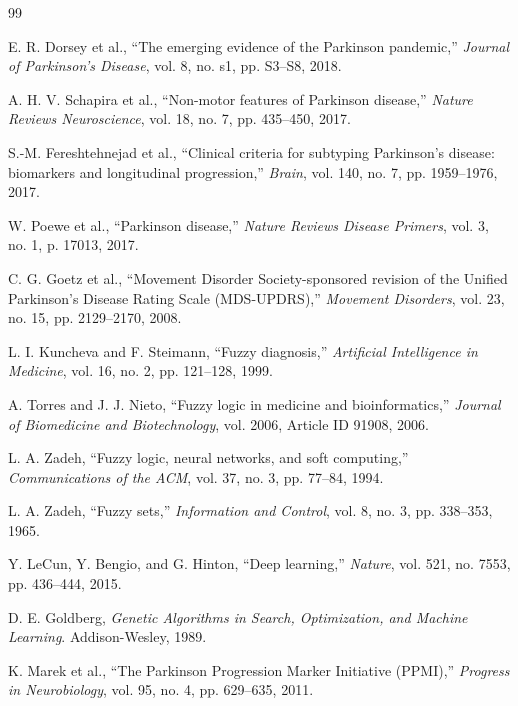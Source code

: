 \documentclass[pdflatex,sn-mathphys-num]{sn-jnl}
\begin{document}
\begin{thebibliography}{99}

E. R. Dorsey et al., ``The emerging evidence of the Parkinson pandemic,'' \textit{Journal of Parkinson's Disease}, vol. 8, no. s1, pp. S3--S8, 2018.

A. H. V. Schapira et al., ``Non-motor features of Parkinson disease,'' \textit{Nature Reviews Neuroscience}, vol. 18, no. 7, pp. 435--450, 2017.

S.-M. Fereshtehnejad et al., ``Clinical criteria for subtyping Parkinson's disease: biomarkers and longitudinal progression,'' \textit{Brain}, vol. 140, no. 7, pp. 1959--1976, 2017.

W. Poewe et al., ``Parkinson disease,'' \textit{Nature Reviews Disease Primers}, vol. 3, no. 1, p. 17013, 2017.

C. G. Goetz et al., ``Movement Disorder Society-sponsored revision of the Unified Parkinson's Disease Rating Scale (MDS-UPDRS),'' \textit{Movement Disorders}, vol. 23, no. 15, pp. 2129--2170, 2008.

L. I. Kuncheva and F. Steimann, ``Fuzzy diagnosis,'' \textit{Artificial Intelligence in Medicine}, vol. 16, no. 2, pp. 121--128, 1999.

A. Torres and J. J. Nieto, ``Fuzzy logic in medicine and bioinformatics,'' \textit{Journal of Biomedicine and Biotechnology}, vol. 2006, Article ID 91908, 2006.

L. A. Zadeh, ``Fuzzy logic, neural networks, and soft computing,'' \textit{Communications of the ACM}, vol. 37, no. 3, pp. 77--84, 1994.

L. A. Zadeh, ``Fuzzy sets,'' \textit{Information and Control}, vol. 8, no. 3, pp. 338--353, 1965.

Y. LeCun, Y. Bengio, and G. Hinton, ``Deep learning,'' \textit{Nature}, vol. 521, no. 7553, pp. 436--444, 2015.

D. E. Goldberg, \textit{Genetic Algorithms in Search, Optimization, and Machine Learning}. Addison-Wesley, 1989.

K. Marek et al., ``The Parkinson Progression Marker Initiative (PPMI),'' \textit{Progress in Neurobiology}, vol. 95, no. 4, pp. 629--635, 2011.


\end{thebibliography}
\end{document}
